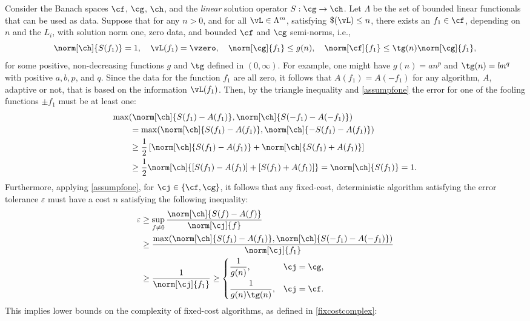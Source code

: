 \documentclass[final]{elsarticle}
\theoremstyle{definition}
\theoremstyle{remark}
\begin{document}
Consider the Banach spaces $\cf$, $\cg$, $\ch$, and the \emph{linear} solution operator $S: \cg \to \ch$.  Let $\Lambda$ be the set of bounded linear functionals that can be used as data. Suppose that for any $n>0$, and for all $\vL \in \Lambda^m$, satisfying $\$(\vL)\le n$, there exists an $f_1 \in \cf$, depending on $n$ and the $L_i$, with solution norm one, zero data, and bounded $\cf$ and $\cg$ semi-norms, i.e.,
\begin{equation} \label{assumpfone}
\norm[\ch]{S(f_1)} = 1, \quad \vL(f_1)= \vzero, \quad
\norm[\cg]{f_1} \le g(n), \quad \norm[\cf]{f_1} \le \tg(n) \norm[\cg]{f_1}, 
\end{equation}
for some positive, non-decreasing functions $g$ and $\tg$ defined in $(0,\infty)$.  For example, one might have $g(n)=an^p$ and $\tg(n)=bn^q$ with positive $a, b, p$, and $q$.  Since the data for the function $f_1$ are all zero, it follows that $A(f_1)=A(-f_1)$ for any algorithm, $A$, adaptive or not, that is based on the information $\vL(f_1)$.  Then, by the triangle inequality and \eqref{assumpfone} the error for one of the fooling functions $\pm f_1$ must be at least one:
\begin{align*}
\MoveEqLeft{\max(\norm[\ch]{S(f_1)-A(f_1)},\norm[\ch]{S(-f_1)-A(-f_1)})} \\
& = \max(\norm[\ch]{S(f_1)-A(f_1)},\norm[\ch]{-S(f_1)-A(f_1)})\\
& \ge \frac{1}{2} \left[ \norm[\ch]{S(f_1)-A(f_1)}+ \norm[\ch]{S(f_1)+A(f_1)} \right] \\
& \ge \frac{1}{2} \norm[\ch]{[S(f_1)-A(f_1)]+[S(f_1)+A(f_1)]} = \norm[\ch]{S(f_1)}=1.
\end{align*}
Furthermore, applying \eqref{assumpfone}, for $\cj \in \{\cf,\cg\}$, it follows that any fixed-cost, deterministic algorithm satisfying the error tolerance $\varepsilon$ must have a cost $n$ satisfying the following inequality:
\begin{align*}
\varepsilon & \ge \sup_{f \ne 0} \frac{\norm[\ch]{S(f)-A(f)}}{\norm[\cj]{f}} \\
& \ge \frac{\max(\norm[\ch]{S(f_1)-A(f_1)},\norm[\ch]{S(-f_1)-A(-f_1)})}{\norm[\cj]{f_1}} \\
& \ge \frac{1}{\norm[\cj]{f_1}} 
\ge \begin{cases} \displaystyle \frac{1}{g(n)}, & \cj=\cg,\\[2ex]
 \displaystyle  \frac{1}{g(n)\tg(n)}, & \cj=\cf.
\end{cases}
\end{align*}
This implies lower bounds on the complexity of fixed-cost algorithms, as defined in \eqref{fixcostcomplex}:
\end{document}

